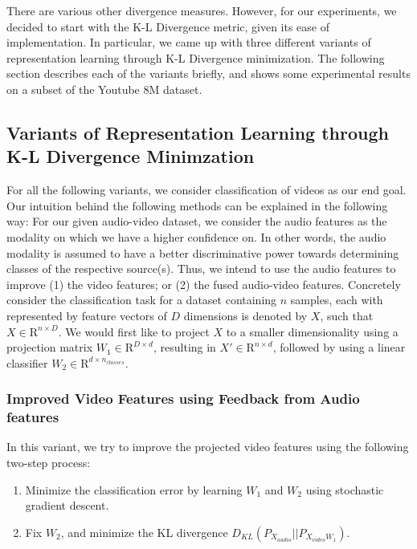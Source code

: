 \documentclass{article}
\begin{document}
There are various other divergence measures. However, for our experiments, we decided to start with the K-L Divergence metric, given its ease of implementation. In particular, we came up with three different variants of representation learning through K-L Divergence minimization. The following section describes each of the variants briefly, and shows some experimental results on a subset of the Youtube 8M dataset.

\subsection{Variants of Representation Learning through K-L Divergence Minimzation}
\label{kl}
For all the following variants, we consider classification of videos as our end goal. Our intuition behind the following methods can be explained in the following way:
For our given audio-video dataset, we consider the audio features as the modality on which we have a higher confidence on. In other words, the audio modality is assumed to have a better discriminative power towards determining classes of the respective source(s). Thus, we intend to use the audio features to improve (1) the video features; or (2) the fused audio-video features. Concretely consider the classification task for a dataset containing $n$ samples, each with represented by feature vectors of $D$ dimensions is denoted by $X$, such that $X \in \mathrm{R}^{n \times D}$. We would first like to project $X$ to a smaller dimensionality using a projection matrix $W_1 \in \mathrm{R}^{D \times d}$, resulting in $X' \in \mathrm{R}^{n \times d}$, followed by using a linear classifier $W_2 \in \mathrm{R}^{d \times n_{classes}}$.

\subsubsection{Improved Video Features using Feedback from Audio features} \label{variant1}
    In this variant, we try to improve the projected video features using the following two-step process:

      \begin{enumerate}
        \item Minimize the classification error by learning $W_1$ and $W_2$ using stochastic gradient descent.
        \item Fix $W_2$, and minimize the KL divergence $D_{KL} (P_{X_{audio}} || P_{X_{video} W_1})$.
      \end{enumerate}  
  
\end{document}
